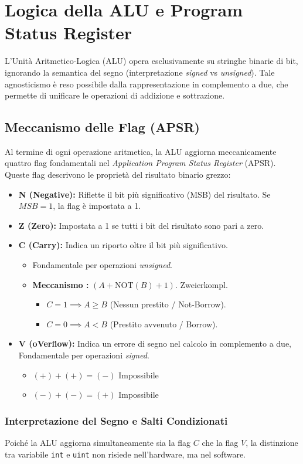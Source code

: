 \section{Logica della ALU e Program Status Register}
\label{sec:alu_logic}

L'Unità Aritmetico-Logica (ALU) opera esclusivamente su stringhe binarie di bit, 
ignorando la semantica del segno (interpretazione \textit{signed} vs \textit{unsigned}).
Tale agnosticismo è reso possibile dalla rappresentazione in complemento a due, che 
permette di unificare le operazioni di addizione e sottrazione.

\subsection{Meccanismo delle Flag (APSR)}
\label{subsec:apsr_flags}

Al termine di ogni operazione aritmetica, la ALU aggiorna meccanicamente quattro flag 
fondamentali nel \textit{Application Program Status Register} (APSR). 
Queste flag descrivono le proprietà del risultato binario grezzo:

\begin{itemize}
    \item \textbf{N (Negative):} Riflette il bit più significativo (MSB) del risultato. Se $MSB=1$, la flag è impostata a 1.
    \item \textbf{Z (Zero):} Impostata a 1 se tutti i bit del risultato sono pari a zero.
    \item \textbf{C (Carry):} Indica un riporto oltre il bit più significativo. 
\begin{itemize}
    \item Fondamentale per operazioni \textit{unsigned}. 
    \item \textbf{Meccanismo :} $(A + \text{NOT}(B) + 1)$. \quad Zweierkompl.
    \begin{itemize}
        \item $C = 1 \implies A \ge B$ (Nessun prestito / Not-Borrow).
        \item $C = 0 \implies A < B$ (Prestito avvenuto / Borrow).
    \end{itemize}
\end{itemize}
    \item \textbf{V (oVerflow):} Indica un errore di segno nel calcolo in complemento 
    a due, Fondamentale per operazioni \textit{signed}.
    \begin{itemize}
        \item $(+) + (+) = (-)$ Impossibile
        \item $(-) + (-) = (+)$ Impossibile
    \end{itemize}
\end{itemize}

\subsubsection{Interpretazione del Segno e Salti Condizionati}
\label{subsec:sign_interpretation}

Poiché la ALU aggiorna simultaneamente sia la flag $C$ che la flag $V$,
la distinzione tra variabile \texttt{int} e \texttt{uint} non risiede nell'hardware, 
ma nel software.

